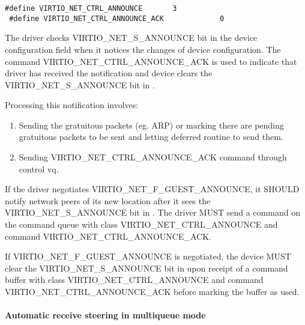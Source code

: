 \begin{lstlisting}
#define VIRTIO_NET_CTRL_ANNOUNCE       3
 #define VIRTIO_NET_CTRL_ANNOUNCE_ACK             0
\end{lstlisting}

The driver checks VIRTIO_NET_S_ANNOUNCE bit in the device configuration  field
when it notices the changes of device configuration. The
command VIRTIO_NET_CTRL_ANNOUNCE_ACK is used to indicate that
driver has received the notification and device clears the
VIRTIO_NET_S_ANNOUNCE bit in .

Processing this notification involves:

\begin{enumerate}
\item Sending the gratuitous packets (eg. ARP) or marking there are pending
  gratuitous packets to be sent and letting deferred routine to
  send them.

\item Sending VIRTIO_NET_CTRL_ANNOUNCE_ACK command through control
  vq.
\end{enumerate}


If the driver negotiates VIRTIO_NET_F_GUEST_ANNOUNCE, it SHOULD notify
network peers of its new location after it sees the VIRTIO_NET_S_ANNOUNCE bit
in .  The driver MUST send a command on the command queue
with class VIRTIO_NET_CTRL_ANNOUNCE and command VIRTIO_NET_CTRL_ANNOUNCE_ACK.


If VIRTIO_NET_F_GUEST_ANNOUNCE is negotiated, the device MUST clear the
VIRTIO_NET_S_ANNOUNCE bit in  upon receipt of a command buffer
with class VIRTIO_NET_CTRL_ANNOUNCE and command VIRTIO_NET_CTRL_ANNOUNCE_ACK
before marking the buffer as used.

\paragraph{Automatic receive steering in multiqueue mode}\label{sec:Device Types / Network Device / Device Operation / Control Virtqueue / Automatic receive steering in multiqueue mode}

